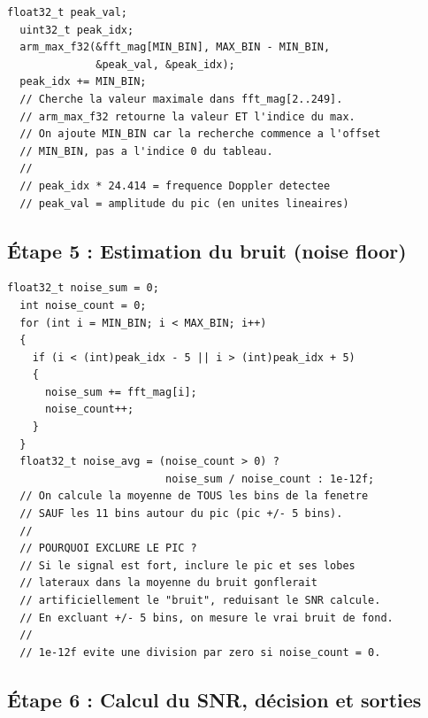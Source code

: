\documentclass[a4paper,11pt]{article}
\begin{document}
\begin{lstlisting}[style=cstyle,caption={Recherche du maximum dans la fen\^etre de fr\'equence}]
  float32_t peak_val;
  uint32_t peak_idx;
  arm_max_f32(&fft_mag[MIN_BIN], MAX_BIN - MIN_BIN,
              &peak_val, &peak_idx);
  peak_idx += MIN_BIN;
  // Cherche la valeur maximale dans fft_mag[2..249].
  // arm_max_f32 retourne la valeur ET l'indice du max.
  // On ajoute MIN_BIN car la recherche commence a l'offset
  // MIN_BIN, pas a l'indice 0 du tableau.
  //
  // peak_idx * 24.414 = frequence Doppler detectee
  // peak_val = amplitude du pic (en unites lineaires)
\end{lstlisting}

\subsection{\'Etape 5 : Estimation du bruit (noise floor)}

\begin{lstlisting}[style=cstyle,caption={Calcul du plancher de bruit en excluant le pic}]
  float32_t noise_sum = 0;
  int noise_count = 0;
  for (int i = MIN_BIN; i < MAX_BIN; i++)
  {
    if (i < (int)peak_idx - 5 || i > (int)peak_idx + 5)
    {
      noise_sum += fft_mag[i];
      noise_count++;
    }
  }
  float32_t noise_avg = (noise_count > 0) ?
                         noise_sum / noise_count : 1e-12f;
  // On calcule la moyenne de TOUS les bins de la fenetre
  // SAUF les 11 bins autour du pic (pic +/- 5 bins).
  //
  // POURQUOI EXCLURE LE PIC ?
  // Si le signal est fort, inclure le pic et ses lobes
  // lateraux dans la moyenne du bruit gonflerait
  // artificiellement le "bruit", reduisant le SNR calcule.
  // En excluant +/- 5 bins, on mesure le vrai bruit de fond.
  //
  // 1e-12f evite une division par zero si noise_count = 0.
\end{lstlisting}

\subsection{\'Etape 6 : Calcul du SNR, d\'ecision et sorties}
\end{document}
